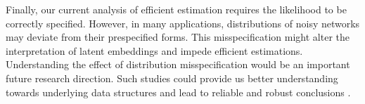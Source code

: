 \documentclass[12pt]{article}
\newcommand{\blue}[1]{\textcolor{blue}{#1}}
\begin{document}
Finally, our current  analysis of efficient estimation  requires the likelihood to be correctly specified.
However, in many applications, 
distributions of noisy networks  may deviate from their prespecified forms. This misspecification might alter the interpretation of latent embeddings and impede efficient estimations.   Understanding the effect of distribution misspecification would be an important future research direction. Such studies could  provide us better understanding towards underlying data structures and lead to  reliable and robust conclusions \citep{rubin2020manifold}. 



\end{document}

